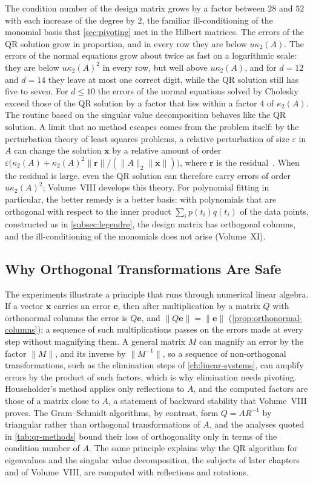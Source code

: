 The condition number of the design matrix grows by a factor between $28$ and $52$ with each increase of the degree by $2$, the familiar ill-conditioning of the monomial basis that \cref{sec:pivoting} met in the Hilbert matrices. The errors of the QR solution grow in proportion, and in every row they are below $u\kappa_2(A)$. The errors of the normal equations grow about twice as fast on a logarithmic scale: they are below $u\kappa_2(A)^2$ in every row, but well above $u\kappa_2(A)$, and for $d=12$ and $d=14$ they leave at most one correct digit, while the QR solution still has five to seven. For $d\le10$ the errors of the normal equations solved by Cholesky exceed those of the QR solution by a factor that lies within a factor $4$ of $\kappa_2(A)$. The routine based on the singular value decomposition behaves like the QR solution. A limit that no method escapes comes from the problem itself: by the perturbation theory of least squares problems, a relative perturbation of size $\varepsilon$ in $A$ can change the solution $\mathbf x$ by a relative amount of order $\varepsilon\bigl(\kappa_2(A)+\kappa_2(A)^2\|\mathbf r\|/(\|A\|_2\|\mathbf x\|)\bigr)$, where $\mathbf r$ is the residual~\cite[Chap.~20]{higham2002accuracy}. When the residual is large, even the QR solution can therefore carry errors of order $u\kappa_2(A)^2$; Volume~VIII develops this theory. For polynomial fitting in particular, the better remedy is a better basis: with polynomials that are orthogonal with respect to the inner product $\sum_ip(t_i)q(t_i)$ of the data points, constructed as in \cref{subsec:legendre}, the design matrix has orthogonal columns, and the ill-conditioning of the monomials does not arise (Volume~XI).

\subsection{Why Orthogonal Transformations Are Safe}

The experiments illustrate a principle that runs through numerical linear algebra. If a vector $\mathbf x$ carries an error $\mathbf e$, then after multiplication by a matrix $Q$ with orthonormal columns the error is $Q\mathbf e$, and $\|Q\mathbf e\|=\|\mathbf e\|$ (\cref{prop:orthonormal-columns}); a sequence of such multiplications passes on the errors made at every step without magnifying them. A general matrix $M$ can magnify an error by the factor $\|M\|$, and its inverse by $\|M^{-1}\|$, so a sequence of non-orthogonal transformations, such as the elimination steps of \cref{ch:linear-systems}, can amplify errors by the product of such factors, which is why elimination needs pivoting. Householder's method applies only reflections to $A$, and the computed factors are those of a matrix close to $A$, a statement of backward stability that Volume~VIII proves. The Gram--Schmidt algorithms, by contrast, form $Q=AR^{-1}$ by triangular rather than orthogonal transformations of $A$, and the analyses quoted in \cref{tab:qr-methods} bound their loss of orthogonality only in terms of the condition number of $A$. The same principle explains why the QR algorithm for eigenvalues and the singular value decomposition, the subjects of later chapters and of Volume~VIII, are computed with reflections and rotations.

